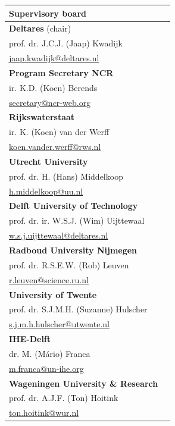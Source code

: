 \begin{table}
\begin{tabular}[t]{ll}
		\end{tabular}
    \begin{tabular}[t]{ll}
        \textbf{Supervisory board}\\
        \hline
        \textbf{Deltares} (chair) \\
           prof. dr. J.C.J. (Jaap) Kwadijk \\ 
           \url{jaap.kwadijk@deltares.nl} \\
        \textbf{Program Secretary NCR} \\
            ir. K.D. (Koen) Berends\\
            \url{secretary@ncr-web.org} \\
       \textbf{Rijkswaterstaat} \\
           ir. K. (Koen) van der Werff\\
           \url{koen.vander.werff@rws.nl} \\
       \textbf{Utrecht University} \\
            prof. dr. H. (Hans) Middelkoop \\ 
           \url{h.middelkoop@uu.nl} \\
       \textbf{Delft University of Technology} \\
            prof. dr. ir. W.S.J. (Wim) Uijttewaal \\ 
            \url{w.s.j.uijttewaal@deltares.nl} \\
       \textbf{Radboud University Nijmegen} \\
            prof. dr. R.S.E.W. (Rob) Leuven \\
            \url{r.leuven@science.ru.nl}\\
       \textbf{University of Twente} \\
            prof. dr. S.J.M.H. (Suzanne) Hulscher \\
            \url{s.j.m.h.hulscher@utwente.nl}\\
       \textbf{IHE-Delft} \\
            dr. M. (M\'ario) Franca \\
            \url{m.franca@un-ihe.org}\\
        \textbf{Wageningen University \& Research}\\
            prof. dr. A.J.F. (Ton) Hoitink \\
            \url{ton.hoitink@wur.nl}\\

    \end{tabular}
	\end{table}



